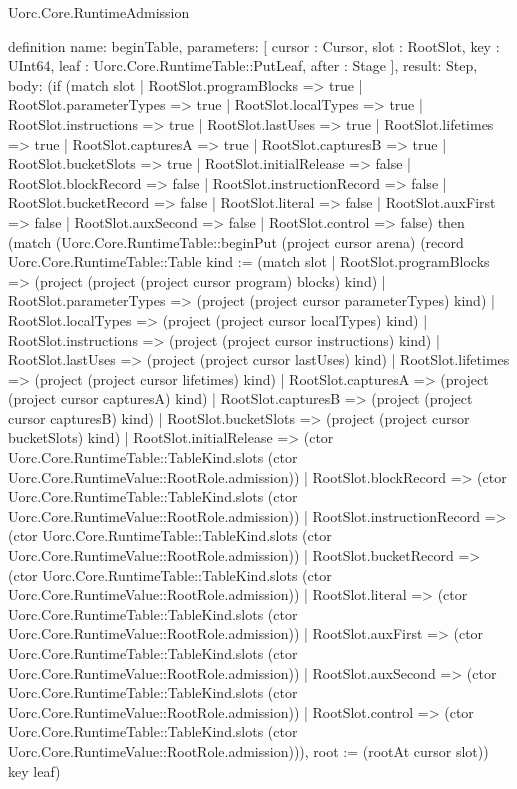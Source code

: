\begin{lexlean}{Uorc.Core.RuntimeAdmission}
\begin{semanticmodule}
definition{
  name: beginTable,
  parameters: [
    cursor : Cursor,
    slot : RootSlot,
    key : UInt64,
    leaf : Uorc.Core.RuntimeTable::PutLeaf,
    after : Stage
  ],
  result: Step,
  body: (if (match slot
    | RootSlot.programBlocks => true
    | RootSlot.parameterTypes => true
    | RootSlot.localTypes => true
    | RootSlot.instructions => true
    | RootSlot.lastUses => true
    | RootSlot.lifetimes => true
    | RootSlot.capturesA => true
    | RootSlot.capturesB => true
    | RootSlot.bucketSlots => true
    | RootSlot.initialRelease => false
    | RootSlot.blockRecord => false
    | RootSlot.instructionRecord => false
    | RootSlot.bucketRecord => false
    | RootSlot.literal => false
    | RootSlot.auxFirst => false
    | RootSlot.auxSecond => false
    | RootSlot.control => false) then (match (Uorc.Core.RuntimeTable::beginPut (project cursor arena) (record Uorc.Core.RuntimeTable::Table {kind := (match slot
      | RootSlot.programBlocks => (project (project (project cursor program) blocks) kind)
      | RootSlot.parameterTypes => (project (project cursor parameterTypes) kind)
      | RootSlot.localTypes => (project (project cursor localTypes) kind)
      | RootSlot.instructions => (project (project cursor instructions) kind)
      | RootSlot.lastUses => (project (project cursor lastUses) kind)
      | RootSlot.lifetimes => (project (project cursor lifetimes) kind)
      | RootSlot.capturesA => (project (project cursor capturesA) kind)
      | RootSlot.capturesB => (project (project cursor capturesB) kind)
      | RootSlot.bucketSlots => (project (project cursor bucketSlots) kind)
      | RootSlot.initialRelease => (ctor Uorc.Core.RuntimeTable::TableKind.slots (ctor Uorc.Core.RuntimeValue::RootRole.admission))
      | RootSlot.blockRecord => (ctor Uorc.Core.RuntimeTable::TableKind.slots (ctor Uorc.Core.RuntimeValue::RootRole.admission))
      | RootSlot.instructionRecord => (ctor Uorc.Core.RuntimeTable::TableKind.slots (ctor Uorc.Core.RuntimeValue::RootRole.admission))
      | RootSlot.bucketRecord => (ctor Uorc.Core.RuntimeTable::TableKind.slots (ctor Uorc.Core.RuntimeValue::RootRole.admission))
      | RootSlot.literal => (ctor Uorc.Core.RuntimeTable::TableKind.slots (ctor Uorc.Core.RuntimeValue::RootRole.admission))
      | RootSlot.auxFirst => (ctor Uorc.Core.RuntimeTable::TableKind.slots (ctor Uorc.Core.RuntimeValue::RootRole.admission))
      | RootSlot.auxSecond => (ctor Uorc.Core.RuntimeTable::TableKind.slots (ctor Uorc.Core.RuntimeValue::RootRole.admission))
      | RootSlot.control => (ctor Uorc.Core.RuntimeTable::TableKind.slots (ctor Uorc.Core.RuntimeValue::RootRole.admission))), root := (rootAt cursor slot)}) key leaf)
}
\end{semanticmodule}
\end{lexlean}
